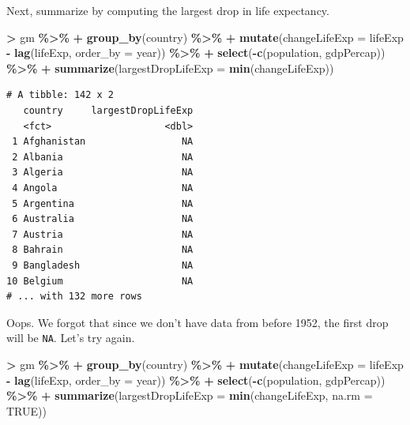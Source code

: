 \documentclass[
]{krantz}
\makeatletter
\newenvironment{Shaded}{\begin{snugshade}}{\end{snugshade}}
\newcommand{\DataTypeTok}[1]{\textcolor[rgb]{0.27,0.27,0.27}{#1}}
\newcommand{\KeywordTok}[1]{\textcolor[rgb]{0.27,0.27,0.27}{\textbf{#1}}}
\newcommand{\NormalTok}[1]{#1}
\newcommand{\OperatorTok}[1]{\textcolor[rgb]{0.43,0.43,0.43}{\textbf{#1}}}
\newcommand{\OtherTok}[1]{\textcolor[rgb]{0.37,0.37,0.37}{#1}}
\newcommand{\StringTok}[1]{\textcolor[rgb]{0.5,0.5,0.5}{#1}}
\newenvironment{kframe}{%
\medskip{}
\setlength{\fboxsep}{.8em}
 \def\at@end@of@kframe{}%
 \ifinner\ifhmode%
  \def\at@end@of@kframe{\end{minipage}}%
  \begin{minipage}{\columnwidth}%
 \fi\fi%
 \def\FrameCommand##1{\hskip\@totalleftmargin \hskip-\fboxsep
 \colorbox{shadecolor}{##1}\hskip-\fboxsep
     \hskip-\linewidth \hskip-\@totalleftmargin \hskip\columnwidth}%
 \MakeFramed {\advance\hsize-\width
   \@totalleftmargin\z@ \linewidth\hsize
   \@setminipage}}%
 {\par\unskip\endMakeFramed%
 \at@end@of@kframe}
\renewenvironment{Shaded}{\begin{kframe}}{\end{kframe}}
\makeatother
\begin{document}
Next, summarize by computing the largest drop in life expectancy.

\begin{Shaded}
\begin{Highlighting}[]
\OperatorTok{\textgreater{}}\StringTok{ }\NormalTok{gm }\OperatorTok{\%\textgreater{}\%}\StringTok{ }
\OperatorTok{+}\StringTok{   }\KeywordTok{group\_by}\NormalTok{(country) }\OperatorTok{\%\textgreater{}\%}\StringTok{ }
\OperatorTok{+}\StringTok{   }\KeywordTok{mutate}\NormalTok{(}\DataTypeTok{changeLifeExp =}\NormalTok{ lifeExp }\OperatorTok{{-}}\StringTok{ }\KeywordTok{lag}\NormalTok{(lifeExp, }\DataTypeTok{order\_by =}\NormalTok{ year)) }\OperatorTok{\%\textgreater{}\%}\StringTok{ }
\OperatorTok{+}\StringTok{   }\KeywordTok{select}\NormalTok{(}\OperatorTok{{-}}\KeywordTok{c}\NormalTok{(population, gdpPercap)) }\OperatorTok{\%\textgreater{}\%}\StringTok{ }
\OperatorTok{+}\StringTok{   }\KeywordTok{summarize}\NormalTok{(}\DataTypeTok{largestDropLifeExp =} \KeywordTok{min}\NormalTok{(changeLifeExp))}
\end{Highlighting}
\end{Shaded}

\begin{verbatim}
# A tibble: 142 x 2
   country     largestDropLifeExp
   <fct>                    <dbl>
 1 Afghanistan                 NA
 2 Albania                     NA
 3 Algeria                     NA
 4 Angola                      NA
 5 Argentina                   NA
 6 Australia                   NA
 7 Austria                     NA
 8 Bahrain                     NA
 9 Bangladesh                  NA
10 Belgium                     NA
# ... with 132 more rows
\end{verbatim}

Oops. We forgot that since we don't have data from before 1952, the first drop will be \texttt{NA}. Let's try again.

\begin{Shaded}
\begin{Highlighting}[]
\OperatorTok{\textgreater{}}\StringTok{ }\NormalTok{gm }\OperatorTok{\%\textgreater{}\%}\StringTok{ }
\OperatorTok{+}\StringTok{   }\KeywordTok{group\_by}\NormalTok{(country) }\OperatorTok{\%\textgreater{}\%}\StringTok{ }
\OperatorTok{+}\StringTok{   }\KeywordTok{mutate}\NormalTok{(}\DataTypeTok{changeLifeExp =}\NormalTok{ lifeExp }\OperatorTok{{-}}\StringTok{ }\KeywordTok{lag}\NormalTok{(lifeExp, }\DataTypeTok{order\_by =}\NormalTok{ year)) }\OperatorTok{\%\textgreater{}\%}\StringTok{ }
\OperatorTok{+}\StringTok{   }\KeywordTok{select}\NormalTok{(}\OperatorTok{{-}}\KeywordTok{c}\NormalTok{(population, gdpPercap)) }\OperatorTok{\%\textgreater{}\%}\StringTok{ }
\OperatorTok{+}\StringTok{   }\KeywordTok{summarize}\NormalTok{(}\DataTypeTok{largestDropLifeExp =} \KeywordTok{min}\NormalTok{(changeLifeExp, }\DataTypeTok{na.rm =} \OtherTok{TRUE}\NormalTok{))}
\end{Highlighting}
\end{Shaded}
\end{document}
